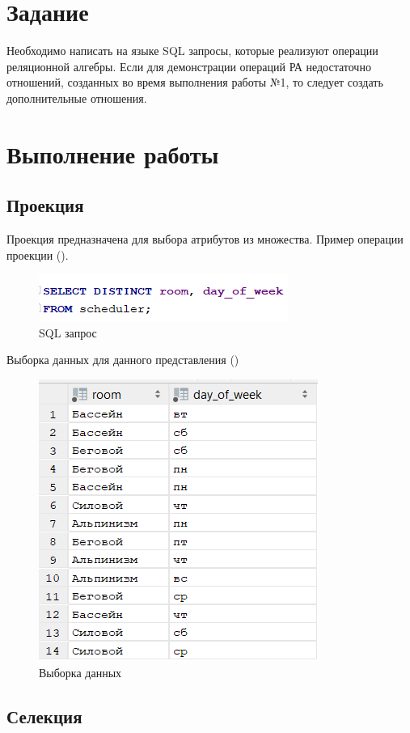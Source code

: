 \documentclass[a4paper,14pt]{article}
\begin{document}

\tableofcontents
\pagebreak

\section{Задание}

Необходимо написать на языке SQL запросы, которые реализуют операции реляционной алгебры. Если для демонстрации операций РА недостаточно отношений, созданных во время выполнения работы №1, то следует создать дополнительные отношения.

\section{Выполнение работы}

\subsection{Проекция}

	Проекция предназначена для выбора атрибутов из множества.
	Пример операции проекции ().
	
	\begin{figure}[H]
		\centering		
		\includegraphics[width=0.4\linewidth]{image/4_010}
		\caption{SQL запрос}\label{img:4_010}
	\end{figure}

	Выборка данных для данного представления ()

	\begin{figure}[H]
		\centering		
		\includegraphics[width=0.4\linewidth]{image/4_011}
		\caption{Выборка данных}\label{img:4_011}
	\end{figure}
 
 \subsection{Селекция}
 
\end{document}
